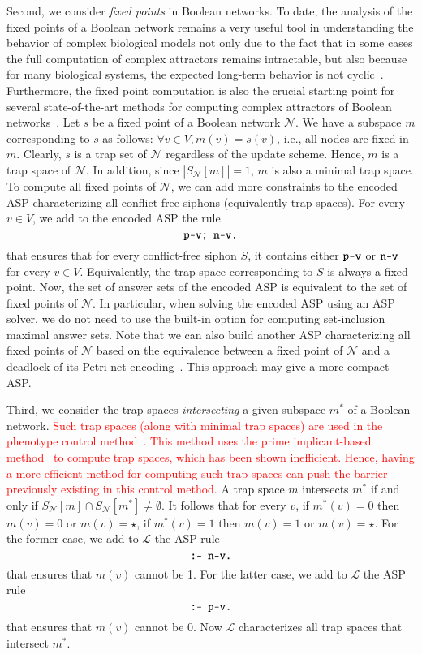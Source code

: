 \documentclass[preprint,12pt]{elsarticle}
\newcommand{\change}[1]{\textcolor{red}{#1}}
\begin{document}
Second, we consider \emph{fixed points} in Boolean networks.
To date, the analysis of the fixed points of a Boolean network remains
a very useful tool in understanding the behavior of complex biological models not only due to the fact that in some cases the full computation of complex attractors remains intractable, but also because for many biological systems, the expected long-term behavior is not cyclic~\cite{corral2021interplay}.
Furthermore, the fixed point computation is also the crucial starting point for several state-of-the-art methods for computing complex attractors of Boolean networks~\cite{DBLP:conf/bcb/TrinhHB22}.
Let \(s\) be a fixed point of a Boolean network \(\mathcal{N}\).
We have a subspace \(m\) corresponding to \(s\) as follows: \(\forall v \in V, m(v) = s(v)\), i.e., all nodes are fixed in \(m\).
Clearly, \(s\) is a trap set of \(\mathcal{N}\) regardless of the update scheme.
Hence, \(m\) is a trap space of \(\mathcal{N}\).
In addition, since \(\left\vert S_{\mathcal{N}}[m]\right\vert = 1\), \(m\) is also a minimal trap space.
To compute all fixed points of \(\mathcal{N}\), we can add more constraints to the encoded ASP characterizing all conflict-free siphons (equivalently trap spaces).
For every \(v \in V\), we add to the encoded ASP the rule
\[
  \verb|p-v; n-v.|
\]
that ensures that for every conflict-free siphon \(S\), it contains either \(\verb|p-v|\) or \(\verb|n-v|\) for every \(v \in V\).
Equivalently, the trap space corresponding to \(S\) is always a fixed point.
Now, the set of answer sets of the encoded ASP is equivalent to the set of fixed points of \(\mathcal{N}\).
In particular, when solving the encoded ASP using an ASP solver, we do not need to use the built-in option for computing set-inclusion maximal answer sets.
Note that we can also build another ASP characterizing all fixed points of \(\mathcal{N}\) based on the equivalence between a fixed point of \(\mathcal{N}\) and a deadlock of its Petri net encoding~\cite{chatain2014characterization}.
This approach may give a more compact ASP\@.

Third, we consider the trap spaces \emph{intersecting} a given subspace \(m^{*}\) of a Boolean network.
\change{Such trap spaces (along with minimal trap spaces) are used in the phenotype control method~\cite{cifuentes2020control}.
This method uses the prime implicant-based method~\cite{klarner2015computing,klarner2017pyboolnet} to compute trap spaces, which has been shown inefficient.
Hence, having a more efficient method for computing such trap spaces can push the barrier previously existing in this control method.
}A trap space \(m\) intersects \(m^{*}\) if and only if \(S_{\mathcal{N}}[m] \cap S_{\mathcal{N}}[m^{*}] \neq \emptyset\).
It follows that for every \(v\), if \(m^{*}(v) = 0\) then \(m(v) = 0\) or \(m(v) = \star\), if \(m^{*}(v) = 1\) then \(m(v) = 1\) or \(m(v) = \star\).
For the former case, we add to \(\mathcal{L}\) the ASP rule
\[
  \verb|:- n-v.|
\]
that ensures that \(m(v)\) cannot be 1.
For the latter case, we add to \(\mathcal{L}\) the ASP rule
\[
  \verb|:- p-v.|
\]
that ensures that \(m(v)\) cannot be 0.
Now \(\mathcal{L}\) characterizes all trap spaces that intersect \(m^{*}\).
\end{document}
